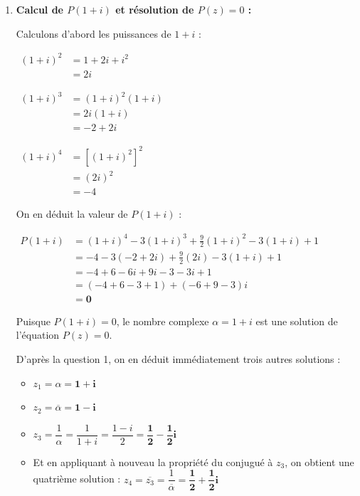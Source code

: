 \documentclass[12pt,a4paper]{article}
\begin{document}
\begin{enumerate}
\begin{itemize}
        Ainsi, $P\left(\dfrac{1}{\alpha}\right) = 0$, donc $\mathbf{\dfrac{1}{\alpha}}$ est également solution de $P(z) = 0$.
    \end{itemize}

    \item \textbf{Calcul de $P(1 + i)$ et résolution de $P(z) = 0$ :}
    
    Calculons d'abord les puissances de $1 + i$ :
    
    $
    \begin{aligned}
        (1 + i)^2 &= 1 + 2i + i^2\\
        &= 2i
    \end{aligned}
    $
    
    $
    \begin{aligned}
        (1 + i)^3 &= (1 + i)^2 (1 + i)\\
        &= 2i(1 + i)\\
        &= -2 + 2i
    \end{aligned}
    $
    
    $
    \begin{aligned}
        (1 + i)^4 &= \left[(1 + i)^2\right]^2\\
        &= (2i)^2\\
        &= -4
    \end{aligned}
    $
    
    On en déduit la valeur de $P(1 + i)$ :
    
    $
    \begin{aligned}
        P(1 + i) &= (1 + i)^4 - 3(1 + i)^3 + \frac{9}{2}(1 + i)^2 - 3(1 + i) + 1\\
        &= -4 - 3(-2 + 2i) + \frac{9}{2}(2i) - 3(1 + i) + 1\\
        &= -4 + 6 - 6i + 9i - 3 - 3i + 1\\
        &= (-4 + 6 - 3 + 1) + (-6 + 9 - 3)i\\
        &= \mathbf{0}
    \end{aligned}
    $
    
    Puisque $P(1 + i) = 0$, le nombre complexe $\alpha = 1 + i$ est une solution de l'équation $P(z) = 0$.
    
    D'après la question 1, on en déduit immédiatement trois autres solutions :
    
    \begin{itemize}
        \item $z_1 = \alpha = \mathbf{1 + i}$
        \item $z_2 = \overline{\alpha} = \mathbf{1 - i}$
        \item $z_3 = \dfrac{1}{\alpha} = \dfrac{1}{1 + i} = \dfrac{1 - i}{2} = \mathbf{\dfrac{1}{2} - \dfrac{1}{2}i}$
        \item Et en appliquant à nouveau la propriété du conjugué à $z_3$, on obtient une quatrième solution : $z_4 = \overline{z_3} = \dfrac{1}{\overline{\alpha}} = \mathbf{\dfrac{1}{2} + \dfrac{1}{2}i}$
    \end{itemize}
    

\end{enumerate}
\end{document}
